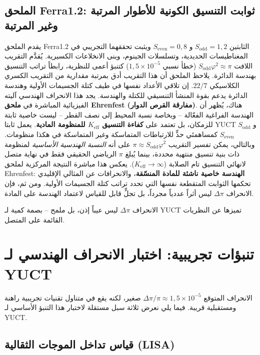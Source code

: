 \documentclass[12pt,a4paper]{article}
\begin{document}
	\subsection{الملحق Ferra1.2: ثوابت التنسيق الكونية للأطوار المرتبة وغير المرتبة}
	
	يقدم الملحق Ferra1.2 الثابتين \(S_{\mathrm{odd}}=1{,}2\) و \(S_{\mathrm{even}}=0{,}8\) ويثبت تحققهما التجريبي في المغناطيسات الحديدية، وتسلسلات الجينوم، وبنى الانخلاعات الكسيرية. يُقدَّم التقريب اللافت \(S_{\mathrm{odd}}\varphi^2 \approx \pi\) (خطأ نسبي \(1{,}5\times10^{-5}\)) كتنبؤ أعمى للنظرية، رابطاً تراتب التنسيق بهندسة الدائرة. يلاحظ الملحق أن هذا التقريب أدق بمرتبة مقدارية من التقريب الكسري الكلاسيكي \(22/7\). إن تلاقي الأعداد نفسها في طيف كتلة الجسيمات الأولية وهندسة الدائرة يدعم بقوة المنشأ التنسيقي للكتلة والهندسة. يجد هذا الانحراف الهندسي آليته الفيزيائية المباشرة في \textbf{ملحق Ehrenfest (مفارقة القرص الدوار)}. هناك، يُظهر أن الهندسة الفراغية الفعّالة – وبخاصة نسبة المحيط إلى نصف القطر – ليست خاصية ثابتة للزمكان، بل تعتمد على \textbf{كفاءة التنسيق \(K_{\mathrm{eff}}\) للمنظومة المادية}. يعمل ثابتا YUCT \(S_{\mathrm{odd}}\) و \(S_{\mathrm{even}}\) كمساهمتَي حدٍّ للارتباطات المتماسكة وغير المتماسكة في هكذا منظومات. وبالتالي، يمكن تفسير التقريب \(\pi \approx S_{\mathrm{odd}}\varphi^2\) على أنه \textit{النسبة الهندسية الأساسية} لمنظومة ذات بنية تنسيق منتهية محددة، بينما يُبلغ \(\pi\) الرياضي الحقيقي فقط في نهاية متصل لانهائي التنسيق تام الصلابة (\(K_{\mathrm{eff}} \to \infty\)). يعكس هذا مباشرة النتيجة المركزية لملحق Ehrenfest: \textbf{الهندسة خاصية ناشئة للمادة المنسّقة}، والانحرافات عن المثالي الإقليدي تحكمها الثوابت المتقطعة نفسها التي تحدد تراتب كتلة الجسيمات الأولية. ومن ثم، فإن الانحراف \(\Delta\pi\) ليس أثراً عددياً مجرداً، بل تجلٍّ قابل للقياس لاعتماد الهندسة على المادة.
	
	الانحراف \(\Delta\pi\) ليس عيباً إذن، بل ملمح – بصمة كمية لـ YUCT تميزها عن النظريات القائمة على المتصل.
	
	\section{تنبؤات تجريبية: اختبار الانحراف الهندسي لـ YUCT}
	
	الانحراف المتوقع \(\Delta\pi/\pi \approx 1{,}5\times10^{-5}\) صغير، لكنه يقع في متناول تقنيات تجريبية راهنة ومستقبلية قريبة. فيما يلي نعرض ثلاثة سبل مستقلة لاختبار هذا التنبؤ الأساسي لـ YUCT.
	
	\subsection{قياس تداخل الموجات الثقالية (LISA)}
	
\end{document}
